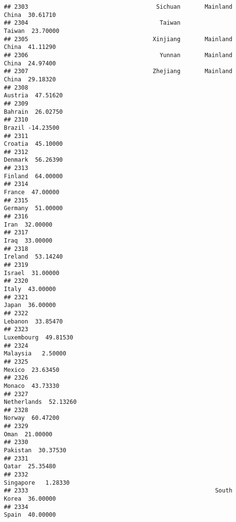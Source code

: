 \documentclass[
]{article}
\begin{document}
\begin{verbatim}
## 2303                                     Sichuan       Mainland China  30.61710
## 2304                                      Taiwan               Taiwan  23.70000
## 2305                                    Xinjiang       Mainland China  41.11290
## 2306                                      Yunnan       Mainland China  24.97400
## 2307                                    Zhejiang       Mainland China  29.18320
## 2308                                                          Austria  47.51620
## 2309                                                          Bahrain  26.02750
## 2310                                                           Brazil -14.23500
## 2311                                                          Croatia  45.10000
## 2312                                                          Denmark  56.26390
## 2313                                                          Finland  64.00000
## 2314                                                           France  47.00000
## 2315                                                          Germany  51.00000
## 2316                                                             Iran  32.00000
## 2317                                                             Iraq  33.00000
## 2318                                                          Ireland  53.14240
## 2319                                                           Israel  31.00000
## 2320                                                            Italy  43.00000
## 2321                                                            Japan  36.00000
## 2322                                                          Lebanon  33.85470
## 2323                                                       Luxembourg  49.81530
## 2324                                                         Malaysia   2.50000
## 2325                                                           Mexico  23.63450
## 2326                                                           Monaco  43.73330
## 2327                                                      Netherlands  52.13260
## 2328                                                           Norway  60.47200
## 2329                                                             Oman  21.00000
## 2330                                                         Pakistan  30.37530
## 2331                                                            Qatar  25.35480
## 2332                                                        Singapore   1.28330
## 2333                                                      South Korea  36.00000
## 2334                                                            Spain  40.00000

\end{verbatim}
\end{document}
